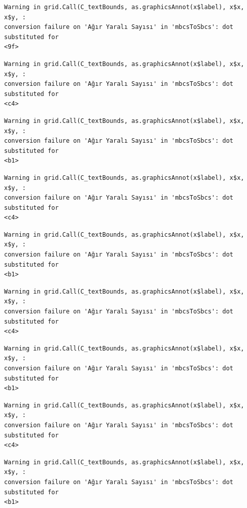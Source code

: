 \documentclass[
  11pt,
  a4paper,
  DIV=11,
  numbers=noendperiod]{scrartcl}
\begin{document}
\begin{verbatim}
Warning in grid.Call(C_textBounds, as.graphicsAnnot(x$label), x$x, x$y, :
conversion failure on 'Ağır Yaralı Sayısı' in 'mbcsToSbcs': dot substituted for
<9f>
\end{verbatim}

\begin{verbatim}
Warning in grid.Call(C_textBounds, as.graphicsAnnot(x$label), x$x, x$y, :
conversion failure on 'Ağır Yaralı Sayısı' in 'mbcsToSbcs': dot substituted for
<c4>
\end{verbatim}

\begin{verbatim}
Warning in grid.Call(C_textBounds, as.graphicsAnnot(x$label), x$x, x$y, :
conversion failure on 'Ağır Yaralı Sayısı' in 'mbcsToSbcs': dot substituted for
<b1>
\end{verbatim}

\begin{verbatim}
Warning in grid.Call(C_textBounds, as.graphicsAnnot(x$label), x$x, x$y, :
conversion failure on 'Ağır Yaralı Sayısı' in 'mbcsToSbcs': dot substituted for
<c4>
\end{verbatim}

\begin{verbatim}
Warning in grid.Call(C_textBounds, as.graphicsAnnot(x$label), x$x, x$y, :
conversion failure on 'Ağır Yaralı Sayısı' in 'mbcsToSbcs': dot substituted for
<b1>
\end{verbatim}

\begin{verbatim}
Warning in grid.Call(C_textBounds, as.graphicsAnnot(x$label), x$x, x$y, :
conversion failure on 'Ağır Yaralı Sayısı' in 'mbcsToSbcs': dot substituted for
<c4>
\end{verbatim}

\begin{verbatim}
Warning in grid.Call(C_textBounds, as.graphicsAnnot(x$label), x$x, x$y, :
conversion failure on 'Ağır Yaralı Sayısı' in 'mbcsToSbcs': dot substituted for
<b1>
\end{verbatim}

\begin{verbatim}
Warning in grid.Call(C_textBounds, as.graphicsAnnot(x$label), x$x, x$y, :
conversion failure on 'Ağır Yaralı Sayısı' in 'mbcsToSbcs': dot substituted for
<c4>
\end{verbatim}

\begin{verbatim}
Warning in grid.Call(C_textBounds, as.graphicsAnnot(x$label), x$x, x$y, :
conversion failure on 'Ağır Yaralı Sayısı' in 'mbcsToSbcs': dot substituted for
<b1>
\end{verbatim}
\end{document}
